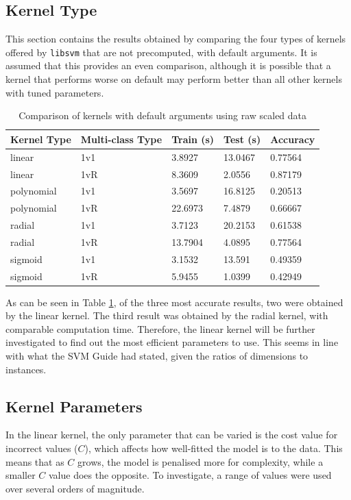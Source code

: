 \documentclass[a4paper, 10pt, conference]{ieeeconf}
\begin{document}
\subsection{Kernel Type}
This section contains the results obtained by comparing the four types of kernels offered by \texttt{libsvm} that are not precomputed, with default arguments. It is assumed that this provides an even comparison, although it is possible that a kernel that performs worse on default may perform better than all other kernels with tuned parameters.

\begin{table}[!ht]
\centering
\caption{Comparison of kernels with default arguments using raw scaled data}\label{tbl:kernel_raw}
\begin{tabular}{lllll}
\textbf{Kernel Type} & \textbf{Multi-class Type} & \textbf{Train (s)} & \textbf{Test (s)} & \textbf{Accuracy}\\ \hline
linear & 1v1 & 3.8927 & 13.0467 & 0.77564\\ \hline
linear & 1vR & 8.3609 & 2.0556 & 0.87179\\ \hline
polynomial & 1v1 & 3.5697 & 16.8125 & 0.20513\\ \hline
polynomial & 1vR & 22.6973 & 7.4879 & 0.66667\\ \hline
radial & 1v1 & 3.7123 & 20.2153 & 0.61538\\ \hline
radial & 1vR & 13.7904 & 4.0895 & 0.77564\\ \hline
sigmoid & 1v1 & 3.1532 & 13.591 & 0.49359\\ \hline
sigmoid & 1vR & 5.9455 & 1.0399 & 0.42949\\ \hline
\end{tabular}
\end{table}

As can be seen in Table \ref{tbl:kernel_raw}, of the three most accurate results, two were obtained by the linear kernel. The third result was obtained by the radial kernel, with comparable computation time. Therefore, the linear kernel will be further investigated to find out the most efficient parameters to use. This seems in line with what the SVM Guide \cite{linear} had stated, given the ratios of dimensions to instances.

\subsection{Kernel Parameters}
In the linear kernel, the only parameter that can be varied is the cost value for incorrect values ($C$), which affects how well-fitted the model is to the data. This means that as $C$ grows, the model is penalised more for complexity, while a smaller $C$ value does the opposite. To investigate, a range of values were used over several orders of magnitude.
\end{document}
